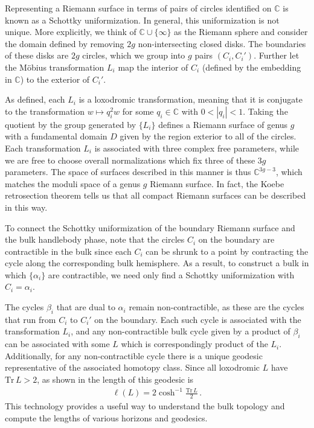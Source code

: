 \documentclass[letterpaper,12pt]{article}
\newcommand{\ban}[1]{\begin{align}#1\end{align}}
\newcommand{\Tr}{\text{Tr}}
\begin{document}
Representing a Riemann surface in terms of pairs of circles identified on $\mathbb C$ is known as a Schottky uniformization. In general, this uniformization is not unique. More explicitly, we think of $\mathbb C \cup \{\infty \}$ as the Riemann sphere and 
consider the domain defined by removing $2g$ non-intersecting closed disks.  The boundaries of these disks are $2g$ circles, which we group into $g$ pairs $(C_i,C_i')$. Further let the M\"obius transformation $L_i$ map the interior of $C_i$ (defined by the embedding in $\mathbb C$) to the exterior of $C_i'$. 

As defined, each $L_i$ is a loxodromic transformation, meaning that it is conjugate to the transformation $w\mapsto q_i^2 w$ for some $q_i \in \mathbb C$ with $0<|q_i|<1$. Taking the quotient by the group generated by $\{L_i\}$ defines a Riemann surface of genus $g$ with a fundamental domain $D$ given by the region exterior to all of the circles. Each transformation $L_i$ is associated with three complex free parameters, while we are free to choose overall normalizations which fix three of these $3g$ parameters. The space of surfaces described in this manner is thus $\mathbb C^{3g-3}$, which matches the moduli space of a genus $g$ Riemann surface. In fact, the Koebe retrosection theorem \cite{koebe} tells us that all compact Riemann surfaces can be described in this way.

To connect the Schottky uniformization of the boundary Riemann surface and the bulk handlebody phase, note that the circles $C_i$ on the boundary are contractible in the bulk since each $C_i$ can be shrunk to a point by contracting the cycle along the corresponding bulk hemisphere.  As a result, to construct a bulk in which $\{\alpha_i\}$ are contractible, we need only find a Schottky uniformization with $C_i = \alpha_i$.

The cycles $\beta_i$ that are dual to $\alpha_i$ remain non-contractible, as these are the cycles that run from $C_i$ to $C_i'$ on the boundary. Each such cycle is associated with the transformation $L_i$, and any non-contractible bulk cycle given by a product of $\beta_i$ can be associated with some $L$ which is correspondingly product of the $L_i$. Additionally, for any non-contractible cycle there is a unique geodesic representative of the associated homotopy class. Since all loxodromic $L$ have $\Tr\, L >2$,  as shown in \cite{Maxfield3D} the length of this geodesic is
\ban{
\ell(L) = 2 \cosh^{-1} \frac{\Tr \,L}{2} \, \label{eq:geodL}.
}
This technology provides a useful way to understand the bulk topology and compute the lengths of various horizons and geodesics.
\end{document}

